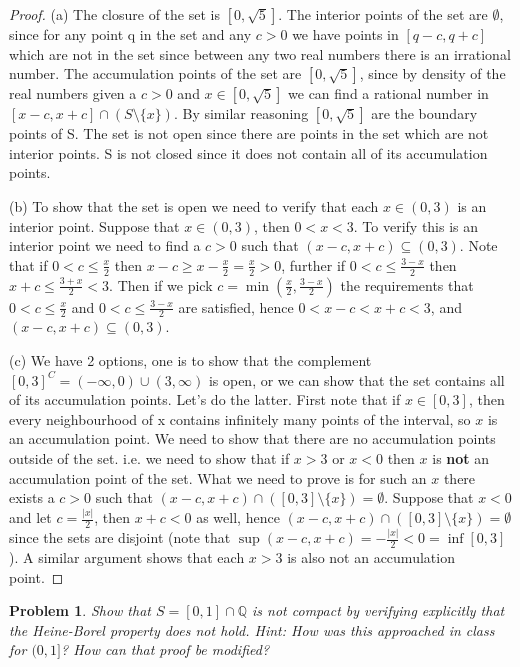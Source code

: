 \documentclass[11pt]{article}
\theoremstyle{plain}
\newtheorem{problem}{Problem}
\theoremstyle{remark}
\newcommand {\mbQ} {\mathbb Q}
\begin{document}
	\begin{proof}
		
		
	
		(a) The closure of the set is $[0, \sqrt 5]$. The interior points of the set are $\emptyset$, since for any point q in the set and any $c>0$ we have points in $[q-c,q+c]$ which are not in the set since between any two real numbers there is an irrational number. The accumulation points of the set are $[0,\sqrt 5]$, since by density of the real numbers given a $c>0$ and $x\in [0,\sqrt 5]$ we can find a rational number in $[x-c,x+c]\cap (S\setminus \{x\})$. By similar reasoning $[0,\sqrt 5]$ are the boundary points of S. The set is not open since there are points in the set which are not interior points. S is not closed since it does not contain all of its accumulation points.
		
		(b) To show that the set is open we need to verify that each $x\in (0,3)$ is an interior point. Suppose that $x\in (0,3)$, then $0<x<3$. To verify this is an interior point we need to find a $c>0$ such that $(x-c,x+c)\subseteq (0,3)$. Note that if $0<c\leq\frac x 2$ then $x-c\geq x - \frac x 2 = \frac x 2 >0$, further if $0<c\leq \frac {3-x} 2$ then $x+c\leq \frac {3+x} 2 < 3$. Then if we pick $c=\min (\frac x 2, \frac {3-x}2)$ the requirements that $0<c\leq \frac x 2$ and $0<c\leq \frac {3-x} 2$ are satisfied, hence $0<x-c<x+c<3$, and $(x-c,x+c)\subseteq (0,3)$.
		
		(c) We have 2 options, one is to show that the complement $[0,3]^C = (-\infty,0)\cup (3,\infty)$ is open, or we can show that the set contains all of its accumulation points. Let's do the latter. First note that if $x\in [0,3]$, then every neighbourhood of x contains infinitely many points of the interval, so $x$ is an accumulation point. We need to show that there are no accumulation points outside of the set. i.e. we need to show that if $x>3$ or $x<0$ then $x$ is \textbf{not} an accumulation point of the set. What we need to prove is for such an $x$ there exists a $c>0$ such that $(x-c,x+c)\cap ([0,3]\setminus \{x\})=\emptyset$. Suppose that $x<0$ and let $c=\frac{|x|}{2}$, then $x+c<0$ as well, hence $(x-c,x+c)\cap ([0,3]\setminus \{x\})=\emptyset$ since the sets are disjoint (note that $\sup (x-c,x+c)=-\frac{|x|}{2}< 0=\inf [0,3]$). A similar argument shows that each $x>3$ is also not an accumulation point.
		
		
	\end{proof}

	\begin{problem}
		Show that $S=[0,1]\cap \mbQ$ is not compact by verifying explicitly that the Heine-Borel property does not hold. Hint: How was this approached in class for $(0,1]$? How can that proof be modified?
	\end{problem}
	
\end{document}
